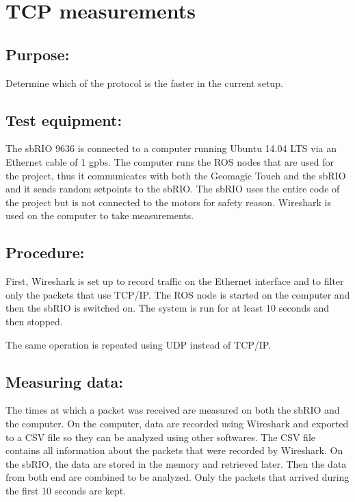 \section{TCP measurements}\label{sec_tcp_mes}

\subsection*{Purpose:}

Determine which of the protocol is the faster in the current setup.

\subsection*{Test equipment:}

The sbRIO 9636 is connected to a computer running Ubuntu 14.04 LTS via an Ethernet cable of 1 gpbs. The computer runs the ROS nodes that are used for the project, thus it communicates with both the Geomagic Touch and the sbRIO and it sends random setpoints to the sbRIO. The sbRIO uses the entire code of the project but is not connected to the motors for safety reason. 
Wireshark is used on the computer to take measurements.%

\subsection*{Procedure:}

First, Wireshark is set up to record traffic on the Ethernet interface and to filter only the packets that use TCP/IP. The ROS node is started on the computer and then the sbRIO is switched on. The system is run for at least 10 seconds and then stopped.

The same operation is repeated using UDP instead of TCP/IP.

\subsection*{Measuring data:}

The times at which a packet was received are measured on both the sbRIO and the computer.
On the computer, data are recorded using Wireshark and exported to a CSV file so they can be analyzed using other softwares. The CSV file contains all information about the packets that were recorded by Wireshark.
On the sbRIO, the data are stored in the memory and retrieved later.
Then the data from both end are combined to be analyzed.
Only the packets that arrived during the first 10 seconds are kept.

